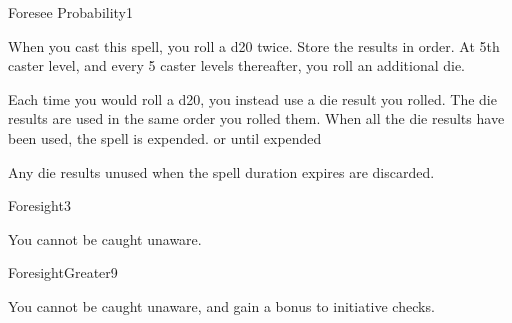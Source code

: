\begin{spellsection}{Foresee Probability}{1}
\begin{spellheader}
\end{spellheader}
\begin{spellcontent}
    \begin{spelltargetinginfo}
    \end{spelltargetinginfo}
    \begin{spelleffects}
        \spelleffect When you cast this spell, you roll a d20 twice. Store the results in order. At 5th caster level, and every 5 caster levels thereafter, you roll an additional die.

        Each time you would roll a d20, you instead use a die result you rolled. The die results are used in the same order you rolled them. When all the die results have been used, the spell is expended.
        \spelldur \durshort or until expended
    \end{spelleffects}
\end{spellcontent}
\begin{spellfooter}
    \spellnotes Any die results unused when the spell duration expires are discarded.
\end{spellfooter}
\end{spellsection}

\begin{spellsection}{Foresight}{3}
\begin{spellheader}
\end{spellheader}
\begin{spellcontent}
    \begin{spelleffects}
        \spelleffect You cannot be caught unaware.
        \spelldur \durext
    \end{spelleffects}
\end{spellcontent}
\begin{spellfooter}
\end{spellfooter}
\end{spellsection}

\begin{spellsection}{Foresight}{Greater}{9}
\begin{spellheader}
\end{spellheader}
\begin{spellcontent}
    \begin{spelleffects}
        \spelleffect You cannot be caught unaware, and gain a  bonus to initiative checks.
        \spelldur \durext
    \end{spelleffects}
\end{spellcontent}
\begin{spellfooter}
\end{spellfooter}
\end{spellsection}

